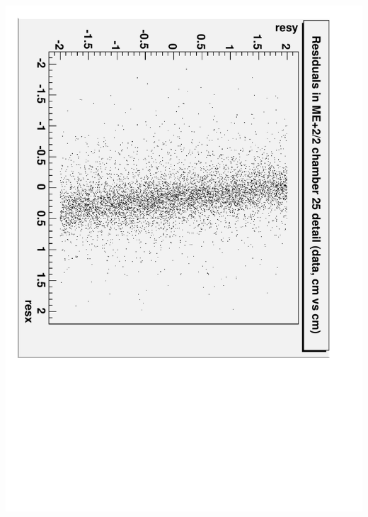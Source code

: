 \documentclass[compress]{beamer}
\begin{document}
\begin{frame}
\begin{columns}
\includegraphics[height=\linewidth, angle=90]{data_residuals_ME22_detail.pdf}
\end{columns}
\end{frame}
\end{document}
